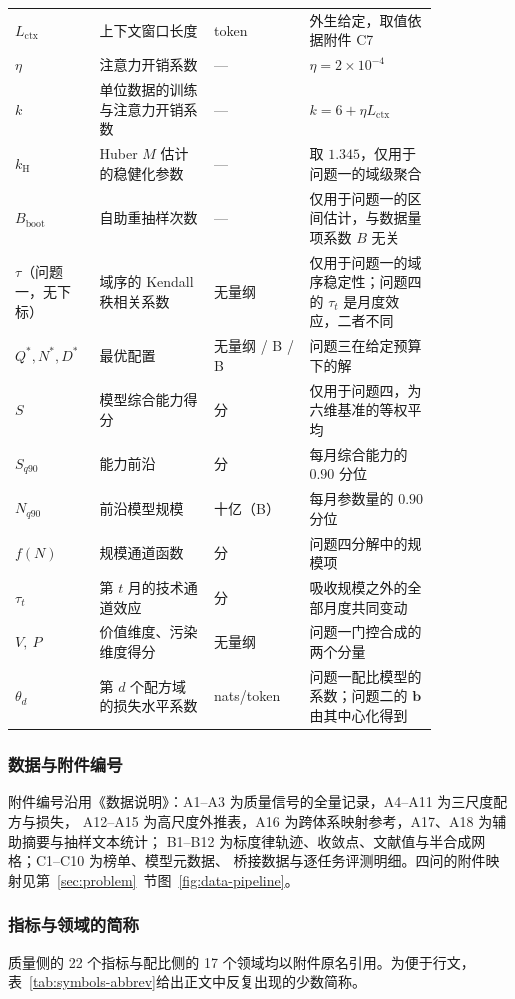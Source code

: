 \begin{longtable}{@{}p{0.13\linewidth}p{0.24\linewidth}p{0.20\linewidth}p{0.27\linewidth}@{}}
  $L_{\text{ctx}}$ & 上下文窗口长度 & token & 外生给定，取值依据附件 C7 \\
  $\eta$ & 注意力开销系数 & — & $\eta=2\times10^{-4}$ \\
  $k$ & 单位数据的训练与注意力开销系数 & — & $k=6+\eta L_{\text{ctx}}$ \\
  $k_{\mathrm{H}}$ & Huber $M$ 估计的稳健化参数 & — & 取 $1.345$，仅用于问题一的域级聚合 \\
  $B_{\mathrm{boot}}$ & 自助重抽样次数 & — & 仅用于问题一的区间估计，与数据量项系数 $B$ 无关 \\
  $\tau$（问题一，无下标） & 域序的 Kendall 秩相关系数 & 无量纲 & 仅用于问题一的域序稳定性；问题四的 $\tau_t$ 是月度效应，二者不同 \\
  $Q^{*},N^{*},D^{*}$ & 最优配置 & 无量纲 / B / B & 问题三在给定预算下的解 \\
  $S$ & 模型综合能力得分 & 分 & 仅用于问题四，为六维基准的等权平均 \\
  $S_{q90}$ & 能力前沿 & 分 & 每月综合能力的 $0.90$ 分位 \\
  $N_{q90}$ & 前沿模型规模 & 十亿（B） & 每月参数量的 $0.90$ 分位 \\
  $f(N)$ & 规模通道函数 & 分 & 问题四分解中的规模项 \\
  $\tau_t$ & 第 $t$ 月的技术通道效应 & 分 & 吸收规模之外的全部月度共同变动 \\
  $V,\ P$ & 价值维度、污染维度得分 & 无量纲 & 问题一门控合成的两个分量 \\
  $\theta_d$ & 第 $d$ 个配方域的损失水平系数 & nats/token & 问题一配比模型的系数；问题二的 $\boldsymbol{b}$ 由其中心化得到 \\
\end{longtable}

\subsubsection{数据与附件编号}
附件编号沿用《数据说明》：A1--A3 为质量信号的全量记录，A4--A11 为三尺度配方与损失，
A12--A15 为高尺度外推表，A16 为跨体系映射参考，A17、A18 为辅助摘要与抽样文本统计；
B1--B12 为标度律轨迹、收敛点、文献值与半合成网格；C1--C10 为榜单、模型元数据、
桥接数据与逐任务评测明细。四问的附件映射见第~\ref{sec:problem}~节图~\ref{fig:data-pipeline}。

\subsubsection{指标与领域的简称}
质量侧的 22 个指标与配比侧的 17 个领域均以附件原名引用。为便于行文，
表~\ref{tab:symbols-abbrev}给出正文中反复出现的少数简称。

